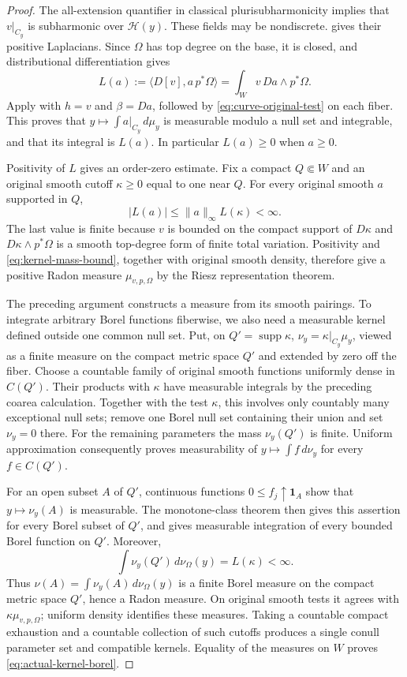\documentclass[11pt,reqno]{amsart}
\theoremstyle{definition}
\theoremstyle{remark}
\numberwithin{equation}{section}
\begin{document}
\begin{proof}
The all-extension quantifier in classical plurisubharmonicity implies
that $v|_{C_y}$ is subharmonic over $\mathscr H(y)$. These fields may
be nondiscrete.  gives their positive
Laplacians. Since $\Omega$ has top degree on the base, it is closed,
and distributional differentiation gives
\[
 L(a):=\langle D[v],a\,p^*\Omega\rangle
      =\int_W v\,Da\wedge p^*\Omega.
\]
Apply  with $h=v$ and $\beta=Da$, followed by
\eqref{eq:curve-original-test} on each fiber. This proves that
$y\mapsto\int a|_{C_y}\,d\mu_y$ is measurable modulo a null set and
integrable, and that its integral is $L(a)$. In particular $L(a)\geq0$
when $a\geq0$.

Positivity of $L$ gives an order-zero estimate. Fix
a compact $Q\Subset W$ and an original smooth cutoff $\kappa\geq0$
equal to one near $Q$. For every original smooth $a$ supported in $Q$,
\begin{equation}\label{eq:kernel-mass-bound}
 |L(a)|\leq\|a\|_\infty L(\kappa)<\infty.
\end{equation}
The last value is finite because $v$ is bounded on the compact
support of $D\kappa$ and $D\kappa\wedge p^*\Omega$ is a smooth
top-degree form of finite total variation. Positivity and
\eqref{eq:kernel-mass-bound}, together with original smooth density,
therefore give a positive Radon measure $\mu_{v,p,\Omega}$ by the
Riesz representation theorem.

The preceding argument constructs a measure from its smooth
pairings. To integrate arbitrary Borel functions fiberwise, we also
need a measurable kernel defined outside one common null set.
Put, on $Q'=\operatorname{supp}\kappa$,
$\nu_y=\kappa|_{C_y}\mu_y$, viewed as a finite measure on the compact
metric space $Q'$ and extended by zero off the fiber. Choose a
countable family of original smooth functions uniformly dense in
$C(Q')$. Their products with $\kappa$ have measurable integrals by
the preceding coarea calculation. Together with the test $\kappa$,
this involves only countably many exceptional null sets; remove one
Borel null set containing their union and set $\nu_y=0$ there.
For the remaining parameters the mass $\nu_y(Q')$ is finite.
Uniform approximation consequently proves measurability of
$y\mapsto\int f\,d\nu_y$ for every $f\in C(Q')$.

For an open subset $A$ of $Q'$, continuous functions
$0\leq f_j\uparrow\mathbf1_A$ show that $y\mapsto\nu_y(A)$ is
measurable. The monotone-class theorem then gives this assertion for
every Borel subset of $Q'$, and gives measurable integration of every
bounded Borel function on $Q'$. Moreover,
\[
 \int \nu_y(Q')\,d\nu_\Omega(y)=L(\kappa)<\infty.
\]
Thus $\nu(A)=\int\nu_y(A)\,d\nu_\Omega(y)$ is a finite Borel measure
on the compact metric space $Q'$, hence a Radon measure. On original
smooth tests it agrees with $\kappa\mu_{v,p,\Omega}$; uniform
density identifies these measures. Taking a countable compact
exhaustion and a countable collection of such cutoffs produces a
single conull parameter set and compatible kernels. Equality of the
measures on $W$ proves \eqref{eq:actual-kernel-borel}.


\end{proof}
\end{document}
